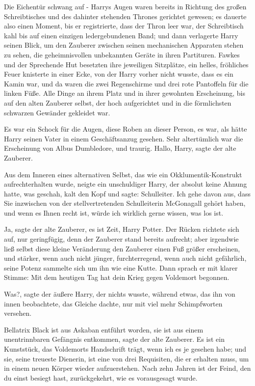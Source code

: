 Die Eichentür schwang auf - Harrys Augen waren bereits in Richtung des großen
Schreibtisches und des dahinter stehenden Thrones gerichtet gewesen; es dauerte
also einen Moment, bis er registrierte, dass der Thron leer war, der
Schreibtisch kahl bis auf einen einzigen ledergebundenen Band; und dann
verlagerte Harry seinen Blick, um den Zauberer zwischen seinen mechanischen
Apparaten stehen zu sehen, die geheimnisvollen unbekannten Geräte in ihren
Partituren. Fawkes und der Sprechende Hut besetzten ihre jeweiligen Sitzplätze,
ein helles, fröhliches Feuer knisterte in einer Ecke, von der Harry vorher nicht
wusste, dass es ein Kamin war, und da waren die zwei Regenschirme und drei rote
Pantoffeln für die linken Füße. Alle Dinge an ihrem Platz und in ihrer gewohnten
Erscheinung, bis auf den alten Zauberer selbst, der hoch aufgerichtet und in die
förmlichsten schwarzen Gewänder gekleidet war.

Es war ein Schock für die Augen, diese Roben an dieser Person, es war, als hätte
Harry seinen Vater in einem Geschäftsanzug gesehen. Sehr altertümlich war die
Erscheinung von Albus Dumbledore, und traurig. \glqq Hallo, Harry\grqq{}, sagte
der alte Zauberer.

Aus dem Inneren eines alternativen Selbst, das wie ein Okklumentik-Konstrukt
aufrechterhalten wurde, neigte ein unschuldiger Harry, der absolut keine Ahnung
hatte, was geschah, kalt den Kopf und sagte: \glqq Schulleiter. Ich gehe davon
aus, dass Sie inzwischen von der stellvertretenden Schulleiterin McGonagall
gehört haben, und wenn es Ihnen recht ist, würde ich wirklich gerne wissen, was
los ist.\grqq{}

\glqq Ja\grqq{}, sagte der alte Zauberer, \glqq es ist Zeit, Harry
Potter.\grqq{} Der Rücken richtete sich auf, nur geringfügig, denn der Zauberer
stand bereits aufrecht; aber irgendwie ließ selbst diese kleine Veränderung den
Zauberer einen Fuß größer erscheinen, und stärker, wenn auch nicht jünger,
furchterregend, wenn auch nicht gefährlich, seine Potenz sammelte sich um ihn
wie eine Kutte. Dann sprach er mit klarer Stimme: \glqq Mit dem heutigen Tag hat
dein Krieg gegen Voldemort begonnen.\grqq{}

\glqq Was?\grqq{}, sagte der äußere Harry, der nichts wusste, während etwas, das
ihn von innen beobachtete, das Gleiche dachte, nur mit viel mehr Schimpfworten
versehen.

\glqq Bellatrix Black ist aus Askaban entführt worden, sie ist aus einem
unentrinnbaren Gefängnis entkommen\grqq{}, sagte der alte Zauberer. \glqq Es ist
ein Kunststück, das Voldemorts Handschrift trägt, wenn ich es je gesehen habe;
und sie, seine treueste Dienerin, ist eine von drei Requisiten, die er erhalten
muss, um in einem neuen Körper wieder aufzuerstehen. Nach zehn Jahren ist der
Feind, den du einst besiegt hast, zurückgekehrt, wie es vorausgesagt
wurde.\grqq{}

